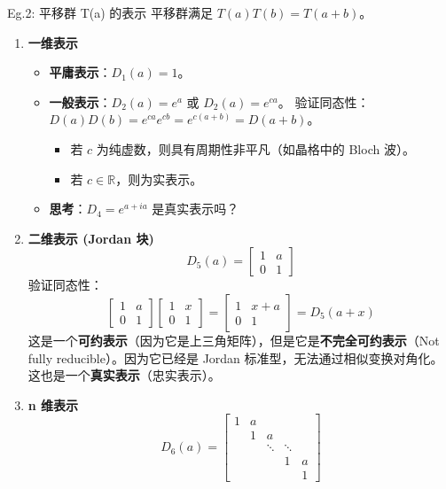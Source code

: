 \begin{example}{Eg.2: 平移群 T(a) 的表示}
    平移群满足 $T(a)T(b) = T(a+b)$。

    \begin{enumerate}
        \item \textbf{一维表示}
    \begin{itemize}
        \item \textbf{平庸表示}：$D_1(a) = 1$。
        \item \textbf{一般表示}：$D_2(a) = e^a$ 或 $D_2(a) = e^{ca}$。
        验证同态性：$D(a)D(b) = e^{ca}e^{cb} = e^{c(a+b)} = D(a+b)$。
        \begin{itemize}
            \item 若 $c$ 为纯虚数，则具有周期性非平凡（如晶格中的 Bloch 波）。
            \item 若 $c \in \mathbb{R}$，则为实表示。
        \end{itemize}
        \item \textbf{思考}：$D_4 = e^{a+ia}$ 是真实表示吗？
    \end{itemize}

        \item \textbf{二维表示 (Jordan 块)}
    \begin{equation}
        D_5(a) = \begin{bmatrix} 1 & a \\ 0 & 1 \end{bmatrix}
    \end{equation}
    验证同态性：
    \begin{equation}
        \begin{bmatrix} 1 & a \\ 0 & 1 \end{bmatrix} \begin{bmatrix} 1 & x \\ 0 & 1 \end{bmatrix} = \begin{bmatrix} 1 & x+a \\ 0 & 1 \end{bmatrix} = D_5(a+x)
    \end{equation}
    这是一个\textbf{可约表示}（因为它是上三角矩阵），但是它是\textbf{不完全可约表示}（Not fully reducible）。因为它已经是 Jordan 标准型，无法通过相似变换对角化。
    这也是一个\textbf{真实表示}（忠实表示）。

        \item \textbf{n 维表示}
    \begin{equation}
        D_6(a) = \begin{bmatrix} 
            1 & a & & & \\ 
             & 1 & a & & \\ 
             & & \ddots & \ddots & \\ 
             & & & 1 & a \\ 
             & & & & 1 
        \end{bmatrix}
    \end{equation}
    \end{enumerate}
\end{example}

